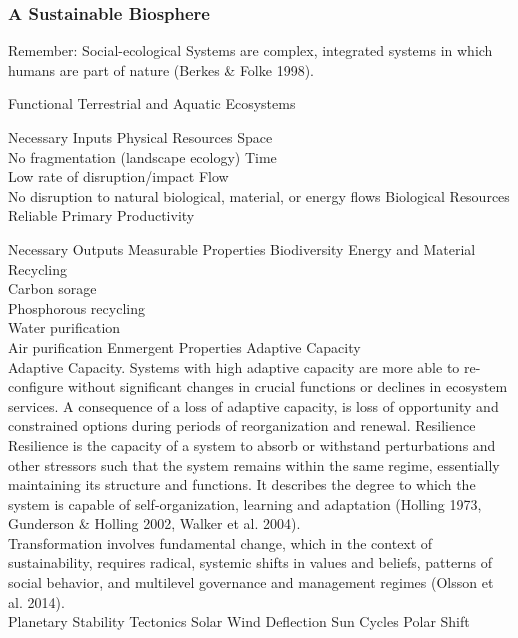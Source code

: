 \documentclass[12pt, letterpaper]{article}
\begin{document}
\subsubsection{A Sustainable Biosphere}
Remember: Social-ecological Systems are complex, integrated systems in which humans are part of nature (Berkes \& Folke 1998).

\begin{outline}[enumerate]
\1 Functional Terrestrial and Aquatic Ecosystems

\2 Necessary Inputs
\3 Physical Resources
\4 Space\\
No fragmentation (landscape ecology)
\4 Time\\
Low rate of disruption/impact
\4 Flow\\
No disruption to natural biological, material, or energy flows
\3 Biological Resources
\4 Reliable Primary Productivity

\2 Necessary Outputs
\3 Measurable Properties
\4 Biodiversity
\4 Energy and Material Recycling\\
Carbon sorage\\
Phosphorous recycling\\
Water purification\\
Air purification
\3 Enmergent Properties
\4 Adaptive Capacity\\
Adaptive Capacity. Systems with high adaptive capacity are more able to re-configure without significant changes in crucial functions or declines in ecosystem services. A consequence of a loss of adaptive capacity, is loss of opportunity and constrained options during periods of reorganization and renewal.
\4 Resilience \\
Resilience is the capacity of a system to absorb or withstand perturbations and other stressors such that the system remains within the same regime, essentially maintaining its structure and functions. It describes the degree to which the system is capable of self-organization, learning and adaptation (Holling 1973, Gunderson \& Holling 2002, Walker et al. 2004). \\

Transformation involves fundamental change, which in the context of sustainability, requires radical, systemic shifts in values and beliefs, patterns of social behavior, and multilevel governance and management regimes (Olsson et al. 2014).\\

\1 Planetary Stability
\2 Tectonics
\2 Solar Wind Deflection
\3 Sun Cycles
\3 Polar Shift

\end{outline}
\end{document}
